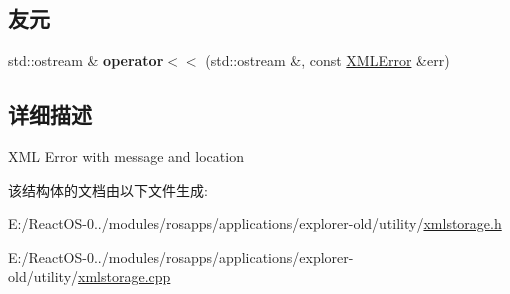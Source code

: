 \subsection*{友元}
\begin{DoxyCompactItemize}
\item 
\mbox{\label{struct_x_m_l_storage_1_1_x_m_l_error_aa9c1348eeebd9278862a80bca45839e5}} 
std\+::ostream \& {\bfseries operator$<$$<$} (std\+::ostream \&, const \hyperlink{struct_x_m_l_storage_1_1_x_m_l_error}{X\+M\+L\+Error} \&err)
\end{DoxyCompactItemize}


\subsection{详细描述}
X\+ML Error with message and location 

该结构体的文档由以下文件生成\+:\begin{DoxyCompactItemize}
\item 
E\+:/\+React\+O\+S-\/0../modules/rosapps/applications/explorer-\/old/utility/\hyperlink{xmlstorage_8h}{xmlstorage.\+h}\item 
E\+:/\+React\+O\+S-\/0../modules/rosapps/applications/explorer-\/old/utility/\hyperlink{xmlstorage_8cpp}{xmlstorage.\+cpp}\end{DoxyCompactItemize}
